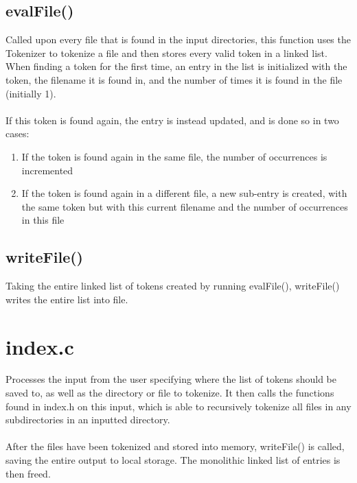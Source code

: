 \documentclass{article}
\begin{document}
\subsection*{evalFile()}
Called upon every file that is found in the input directories, this function uses the Tokenizer to tokenize a file and then stores every valid token in a linked list. When finding a token for the first time, an entry in the list is initialized with the token, the filename it is found in, and the number of times it is found in the file (initially 1). 
\\
\\
If this token is found again, the entry is instead updated, and is done so in two cases:
\begin{enumerate}
\item If the token is found again in the same file, the number of occurrences is incremented
\item If the token is found again in a different file, a new sub-entry is created, with the same token but with this current filename and the number of occurrences in this file
\end{enumerate}
\subsection*{writeFile()}
Taking the entire linked list of tokens created by running evalFile(), writeFile() writes the entire list into file.

\section{index.c}
Processes the input from the user specifying where the list of tokens should be saved to, as well as the directory or file to tokenize. It then calls the functions found in index.h on this input, which is able to recursively tokenize all files in any subdirectories in an inputted directory.
\\
\\
After the files have been tokenized and stored into memory, writeFile() is called, saving the entire output to local storage. The monolithic linked list of entries is then freed.
\end{document}

